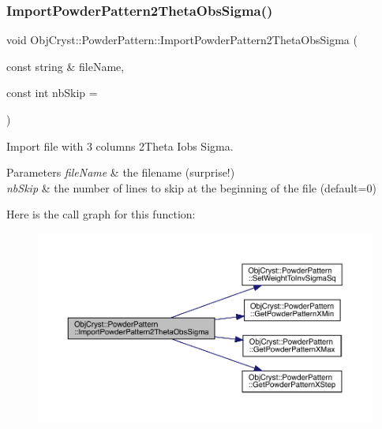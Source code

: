 \subsubsection{\texorpdfstring{ImportPowderPattern2ThetaObsSigma()}{ImportPowderPattern2ThetaObsSigma()}}
{\footnotesize\ttfamily void Obj\+Cryst\+::\+Powder\+Pattern\+::\+Import\+Powder\+Pattern2\+Theta\+Obs\+Sigma (\begin{DoxyParamCaption}\item[{const string \&}]{file\+Name,  }\item[{const int}]{nb\+Skip = {} }\end{DoxyParamCaption})}



Import file with 3 columns 2Theta Iobs Sigma. 


\begin{DoxyParams}{Parameters}
{\em file\+Name} & the filename (surprise!) \\
\hline
{\em nb\+Skip} & the number of lines to skip at the beginning of the file (default=0) \\
\hline
\end{DoxyParams}
Here is the call graph for this function\+:
\nopagebreak
\begin{figure}[H]
\begin{center}
\leavevmode
\includegraphics[width=350pt]{class_obj_cryst_1_1_powder_pattern_aee56a2f23b8af5c855ceae82c246f242_cgraph}
\end{center}
\end{figure}
\mbox{\label{class_obj_cryst_1_1_powder_pattern_a50348c3084e39c0c8f46a3ddccc03e1f}} 
